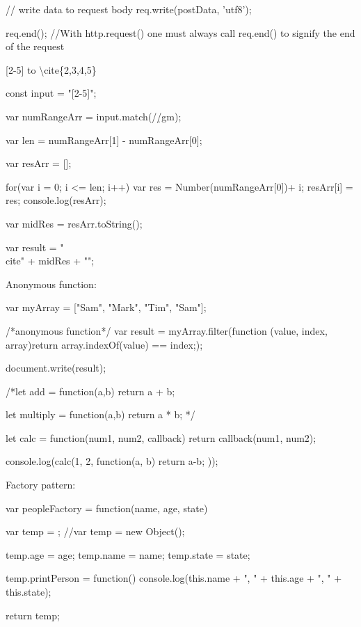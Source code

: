 \documentclass[a4paper,12pt]{article}
\begin{document}
\begin{description}
\begin{jscode}
// write data to request body
req.write(postData, 'utf8');

req.end(); //With http.request() one must always call req.end() to signify the end of the request	
\end{jscode}
	
\item {[2-5]} to \textbackslash cite\{2,3,4,5\}
\begin{jscode}
const input = "[2-5]";

var numRangeArr = input.match(/\d/gm);

var len = numRangeArr[1] - numRangeArr[0];

var resArr = [];

for(var i = 0; i <= len; i++){
	var res = Number(numRangeArr[0])+ i;
	resArr[i] = res;
	console.log(resArr);
}

var midRes = resArr.toString();

var result = "\\cite{" + midRes + "}";
\end{jscode}

\item Anonymous function:
\begin{jscode}
var myArray = ["Sam", "Mark", "Tim", "Sam"];

/*anonymous function*/
var result = myArray.filter(function (value, index, array){return array.indexOf(value) == index;});

document.write(result);
\end{jscode}
\begin{jscode}
/*let add = function(a,b){
	return a + b;
}

let multiply = function(a,b){
	return a * b;
}*/

let calc = function(num1, num2, callback){
	return callback(num1, num2);
}

console.log(calc(1, 2, function(a, b){
	return a-b;
}));
\end{jscode}


\item Factory pattern:
\begin{jscode}
var peopleFactory = function(name, age, state){

	var temp = {};
	//var temp = new Object();

	temp.age = age;
	temp.name = name;
	temp.state = state;

	temp.printPerson = function(){
		console.log(this.name + ", " + this.age + ", " + this.state);
	}

	return temp;
}


\end{jscode}
\end{description}
\end{document}
